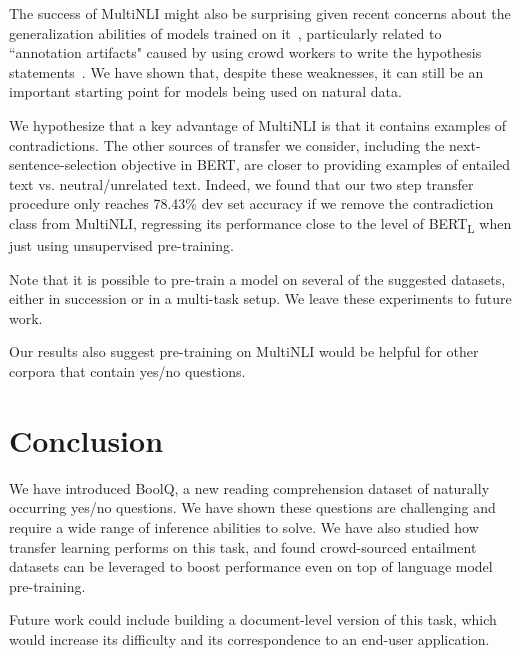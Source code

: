 The success of MultiNLI might also be surprising given recent concerns about the generalization abilities of models trained on it~\cite{glockner2018breaking}, particularly related to ``annotation artifacts" caused by using crowd workers to write the hypothesis statements~\cite{gururangan2018annotation}. We have shown that, despite these weaknesses, it can still be an important starting point for models being used on natural data.

We hypothesize that a key advantage of MultiNLI is that it contains examples of contradictions. The other sources of transfer we consider, including the next-sentence-selection objective in BERT, are closer to providing examples of entailed text vs. neutral/unrelated text. Indeed, we found that our two step transfer procedure only reaches 78.43\% dev set accuracy if we remove the contradiction class from MultiNLI, regressing its performance close to the level of BERT\textsubscript{L} when just using unsupervised pre-training.

Note that it is possible to pre-train a model on several of the suggested datasets, either in succession or in a multi-task setup. We leave these experiments to future work.

Our results also suggest pre-training on MultiNLI would be helpful for other corpora that contain yes/no questions.

\section{Conclusion}
We have introduced BoolQ, a new reading comprehension dataset of naturally occurring yes/no questions. We have shown these questions are challenging and require a wide range of inference abilities to solve. We have also studied how transfer learning performs on this task, and found crowd-sourced entailment datasets can be leveraged to boost performance even on top of language model pre-training.

Future work could include building a document-level version of this task, which would increase its difficulty and its correspondence to an end-user application.


